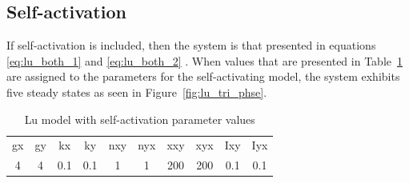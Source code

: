 \subsection{Self-activation}
If self-activation is included, then the system is that presented in equations \ref{eq:lu_both_1} and \ref{eq:lu_both_2} . When values that are presented in Table~\ref{tab:lu_dp_tri} are assigned to the parameters for the self-activating model, the system exhibits five steady states as seen in Figure~\ref{fig:lu_tri_phse}. 

\begin{table}[h]
\centering
\caption{Lu model with self-activation parameter values}
\label{tab:lu_dp_tri}
\begin{tabular}{cccccccccc}
gx    & gy    & kx    & ky    & nxy & nyx & xxy     & xyx     & Ixy   & Iyx \\
4&4     &0.1   & 0.1   &  1  &  1  &  200    &  200    & 0.1    &   0.1
\end{tabular}
\end{table}

